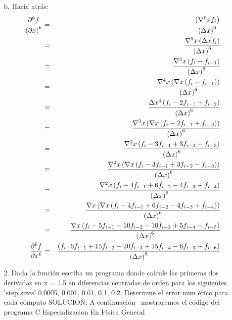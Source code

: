 \documentclass{article}
\begin{document}
\bigskip 

\bigskip 

\bigskip 

\begin{enumerate}
\item[b.]  Hacia atr\'{a}s:\newline
\begin{eqnarray*}
\frac{\partial ^{6}f}{\left( \partial x\right) ^{6}} &=&\frac{\left( \nabla
^{6}xf_{i}\right) }{\left( \Delta x\right) ^{6}} \\
&=&\frac{\nabla ^{5}x\left( \Delta xf_{i}\right) }{\left( \Delta x\right)
^{6}} \\
&=&\frac{\nabla ^{5}x\left( f_{i}-f_{i-1}\right) }{\left( \Delta x\right)
^{6}} \\
&=&\frac{\nabla ^{4}x\left( \nabla x\left( f_{i}-f_{i-1}\right) \right) }{%
\left( \Delta x\right) ^{6}} \\
&=&\frac{\Delta x^{4}\left( f_{i}-2f_{i-1}+f_{i-2}\right) }{\left( \Delta
x\right) ^{6}} \\
&=&\frac{\nabla ^{3}x\left( \nabla x\left( f_{i}-2f_{i-1}+f_{i-2}\right)
\right) }{\left( \Delta x\right) ^{6}} \\
&=&\frac{\nabla ^{3}x\left( f_{i}-3f_{i-1}+3f_{i-2}-f_{i-3}\right) }{\left(
\Delta x\right) ^{6}} \\
&=&\frac{\nabla ^{2}x\left( \nabla x\left(
f_{i}-3f_{i-1}+3f_{i-2}-f_{i-3}\right) \right) }{\left( \Delta x\right) ^{6}}
\\
&=&\frac{\nabla ^{2}x\left( f_{i}-4f_{i-1}+6f_{i-2}-4f_{i-3}+f_{i-4}\right) 
}{\left( \Delta x\right) ^{6}} \\
&=&\frac{\nabla x\left( \nabla x\left(
f_{i}-4f_{i-1}+6f_{i-2}-4f_{i-3}+f_{i-4}\right) \right) }{\left( \Delta
x\right) ^{6}} \\
&=&\frac{\nabla x\left(
f_{i}-5f_{i-1}+10f_{i-2}-10f_{i-3}+5f_{i-4}-f_{i-5}\right) }{\left( \Delta
x\right) ^{6}} \\
\frac{\partial ^{6}f}{\partial x^{6}} &=&\frac{\left(
f_{i-}6f_{i-1}+15f_{i-2}-20f_{i-3}+15f_{i-4}-6f_{i-5}+f_{i-6}\right) }{%
\left( \Delta x\right) ^{6}}
\end{eqnarray*}

\item[2.]  Dada la funci\'{o}n escriba un programa donde calcule las
primeras dos derivadas en x = 1.5 en diferencias centradas de orden para los
siguientes 'step sizes' 0.0005, 0.001, 0.01, 0.1, 0.2. Determine el error num%
\'{e}rico para cada c\'{o}mputo\newline
SOLUCION: \newline
A continuaci\'{o}n \ mostraremos el c\'{o}digo del programa C
Especializacion En Fisica General
\end{enumerate}
\end{document}
